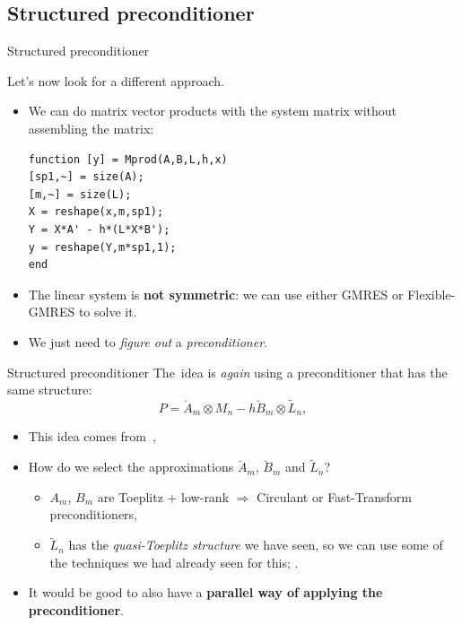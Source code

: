 \documentclass[aspectratio=169,xcolor=dvipsnames]{beamer}
\begin{document}
\subsection{Structured preconditioner}

\begin{frame}[fragile]{Structured preconditioner}

Let's now look for a different approach.
\begin{itemize}
	\item[\faFastForward]<2-> We can do matrix vector products with the system matrix without assembling the matrix:\vspace{-1em}
	\begin{verbatim}
function [y] = Mprod(A,B,L,h,x)
[sp1,~] = size(A);
[m,~] = size(L);
X = reshape(x,m,sp1);
Y = X*A' - h*(L*X*B');
y = reshape(Y,m*sp1,1);
end
	\end{verbatim}
	\item[\faWrench]<3-> The linear system is \alert{\textbf{not symmetric}}: we can use either GMRES or Flexible-GMRES to solve it.
	\item[\faHammer]<4-> We just need to \emph{figure out} a \emph{preconditioner}.
\end{itemize}

\end{frame}

\begin{frame}{Structured preconditioner}
The \alert{\faKey\,idea} is \emph{again} using a preconditioner that has the same structure:
\[
P = \breve{A}_m \otimes M_n -h \breve{B}_m \otimes \tilde{L}_n,
\]
\begin{itemize}
	\item[\faBook]<1-> This idea comes from~\parencite{MR1784824,MR1854266,MR1812028},
	\item[\faLightbulb]<2-> How do we select the approximations $\breve{A}_m$, $\breve{B}_m$ and $\tilde{L}_n$?
	\begin{itemize}
		\item[\faCog]<3-> \normalsize $A_m$, $B_m$ are Toeplitz + low-rank $\Rightarrow$ Circulant or Fast-Transform preconditioners,
		\item[\faCog]<3-> \normalsize $\tilde{L}_n$ has the \emph{quasi-Toeplitz structure} we have seen, so we can use some of the techniques we had already seen for this; \parencite{MR3860196}. 
	\end{itemize}
	\item[\faHammer]<4-> It would be good to also have a \alert{\textbf{parallel way of applying the preconditioner}}.
\end{itemize}
\end{frame}
\end{document}
